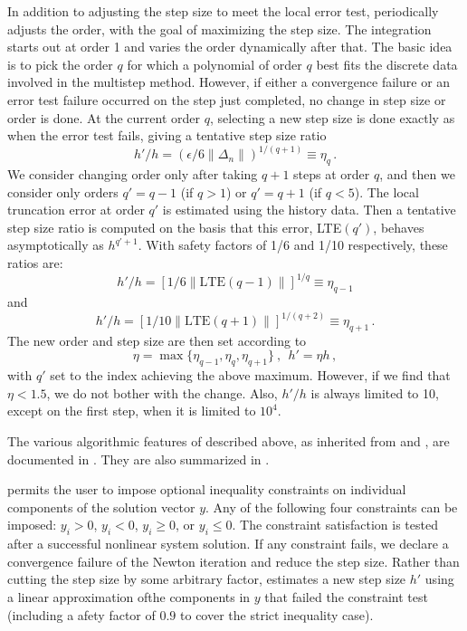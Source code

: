 In addition to adjusting the step size to meet the local error test,
{\cvode} periodically adjusts the order, with the goal of maximizing the
step size.  The integration starts out at order 1 and varies the order
dynamically after that.  The basic idea is to pick the order $q$ for
which a polynomial of order $q$ best fits the discrete data involved
in the multistep method.  However, if either a convergence failure or
an error test failure occurred on the step just completed, no change
in step size or order is done.  At the current order $q$, selecting a
new step size is done exactly as when the error test fails, giving a
tentative step size ratio
\[ h'/h = (\epsilon / 6 \|\Delta_n\| )^{1/(q+1)} \equiv \eta_q \, . \]
We consider changing order only after taking $q+1$ steps at order $q$,
and then we consider only orders $q' = q - 1$ (if $q > 1$) or
$q' = q + 1$ (if $q < 5$).  The local truncation error at order $q'$
is estimated using the history data.  Then a tentative step size ratio
is computed on the basis that this error, LTE$(q')$, behaves
asymptotically as $h^{q'+1}$.  With safety factors of 1/6 and
1/10 respectively, these ratios are:
\[ h'/h = [1 / 6 \|\mbox{LTE}(q-1)\| ]^{1/q} \equiv \eta_{q-1} \]
and
\[ h'/h = [1 / 10 \|\mbox{LTE}(q+1)\| ]^{1/(q+2)} \equiv \eta_{q+1} \, . \]
The new order and step size are then set according to
\[ \eta = \max\{\eta_{q-1},\eta_q,\eta_{q+1}\} ~,~~ h' = \eta h \, , \]
with $q'$ set to the index achieving the above maximum.
However, if we find that $\eta < 1.5$, we do not bother with the
change.  Also, $h'/h$ is always limited to 10, except on the first
step, when it is limited to $10^4$.

The various algorithmic features of {\cvodes} described above, as
inherited from {\vode} and {\vodpk}, are documented in
\cite{BBH:89,Byr:92,Hin:00}.  They are also summarized in
\cite{HBGLSSW:05}.

{\cvodes} permits the user to impose optional inequality constraints on individual
components of the solution vector $y$. Any of the following four constraints
can be imposed: $y_i > 0$, $y_i < 0$, $y_i \geq 0$, or $y_i \leq 0$.
The constraint satisfaction is tested after a successful nonlinear system solution.
If any constraint fails, we declare a convergence failure of the Newton iteration
and reduce the step size. Rather than cutting the step size by some arbitrary factor,
{\cvodes} estimates a new step size $h'$ using a linear approximation ofthe components
in $y$ that failed the constraint test (including a afety factor of $0.9$ to
cover the strict inequality case).

